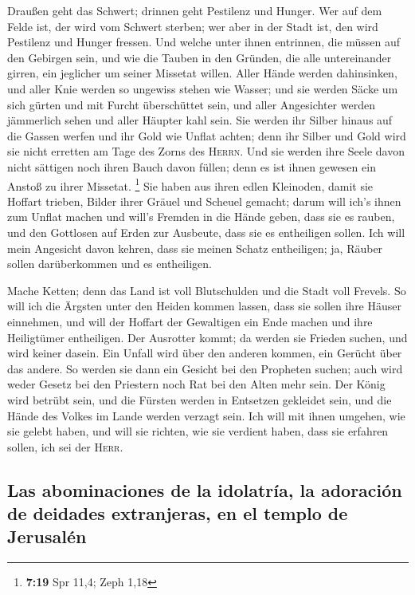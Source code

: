  Draußen geht das Schwert; drinnen geht Pestilenz und
Hunger. Wer auf dem Felde ist, der wird vom Schwert sterben; wer aber in
der Stadt ist, den wird Pestilenz und Hunger fressen. 
Und welche unter ihnen entrinnen, die müssen auf den Gebirgen sein, und
wie die Tauben in den Gründen, die alle untereinander girren, ein
jeglicher um seiner Missetat willen.  Aller Hände werden
dahinsinken, und aller Knie werden so ungewiss stehen wie Wasser;
 und sie werden Säcke um sich gürten und mit Furcht
überschüttet sein, und aller Angesichter werden jämmerlich sehen und
aller Häupter kahl sein.  Sie werden ihr Silber hinaus
auf die Gassen werfen und ihr Gold wie Unflat achten; denn ihr Silber
und Gold wird sie nicht erretten am Tage des Zorns des \textsc{Herrn}.
Und sie werden ihre Seele davon nicht sättigen noch ihren Bauch davon
füllen; denn es ist ihnen gewesen ein Anstoß zu ihrer Missetat.
\footnote{\textbf{7:19} Spr 11,4; Zeph 1,18}  Sie haben
aus ihren edlen Kleinoden, damit sie Hoffart trieben, Bilder ihrer
Gräuel und Scheuel gemacht; darum will ich's ihnen zum Unflat machen
 und will's Fremden in die Hände geben, dass sie es
rauben, und den Gottlosen auf Erden zur Ausbeute, dass sie es
entheiligen sollen.  Ich will mein Angesicht davon
kehren, dass sie meinen Schatz entheiligen; ja, Räuber sollen
darüberkommen und es entheiligen.

 Mache Ketten; denn das Land ist voll Blutschulden und
die Stadt voll Frevels.  So will ich die Ärgsten unter
den Heiden kommen lassen, dass sie sollen ihre Häuser einnehmen, und
will der Hoffart der Gewaltigen ein Ende machen und ihre Heiligtümer
entheiligen.  Der Ausrotter kommt; da werden sie Frieden
suchen, und wird keiner dasein.  Ein Unfall wird über den
anderen kommen, ein Gerücht über das andere. So werden sie dann ein
Gesicht bei den Propheten suchen; auch wird weder Gesetz bei den
Priestern noch Rat bei den Alten mehr sein.  Der König
wird betrübt sein, und die Fürsten werden in Entsetzen gekleidet sein,
und die Hände des Volkes im Lande werden verzagt sein. Ich will mit
ihnen umgehen, wie sie gelebt haben, und will sie richten, wie sie
verdient haben, dass sie erfahren sollen, ich sei der \textsc{Herr}.

\hypertarget{las-abominaciones-de-la-idolatruxeda-la-adoraciuxf3n-de-deidades-extranjeras-en-el-templo-de-jerusaluxe9n}{%
\subsection{Las abominaciones de la idolatría, la adoración de deidades
extranjeras, en el templo de
Jerusalén}\label{las-abominaciones-de-la-idolatruxeda-la-adoraciuxf3n-de-deidades-extranjeras-en-el-templo-de-jerusaluxe9n}}

